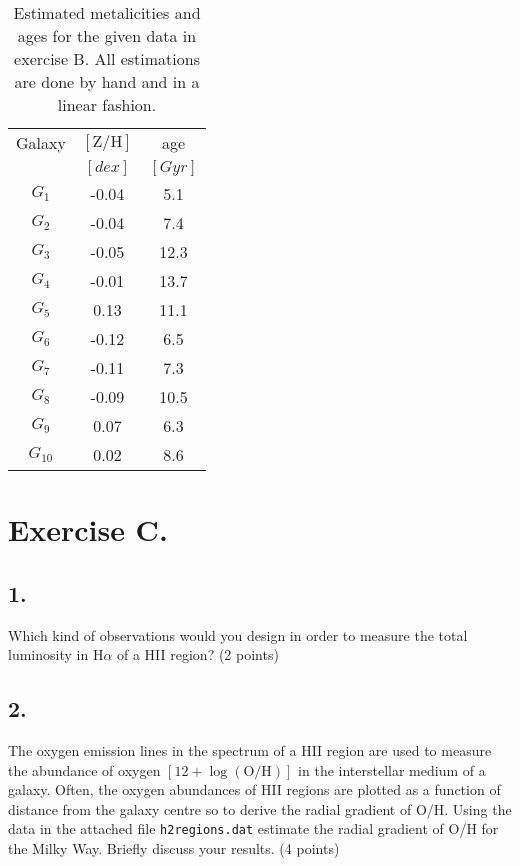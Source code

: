 \documentclass[11pt,a4paper,twoside]{article}
\newcommand{\ZH}{\ensuremath{[\text{Z}/\text{H}]} }
\begin{document}
\begin{table}[h!]
\centering
\begin{tabular}{ccc}\toprule
Galaxy  & \ZH           & age               \\
        & $[\si{dex}]$  & $[\si{Gyr}]$      \\ \midrule
$G_1$   & -0.04         & 5.1				\\
$G_2$   & -0.04	        & 7.4				\\
$G_3$   & -0.05	        & 12.3				\\
$G_4$   & -0.01	        & 13.7				\\
$G_5$   & 0.13	        & 11.1				\\
$G_6$   & -0.12	        & 6.5				\\
$G_7$   & -0.11	        & 7.3				\\
$G_8$   & -0.09	        & 10.5				\\
$G_9$   & 0.07	        & 6.3				\\
$G_{10}$& 0.02	        & 8.6				\\
\bottomrule
\end{tabular}
\caption{Estimated metalicities and ages for the given data in
exercise B. All estimations are done by hand and in a linear 
fashion.}
\label{tab:am}
\end{table}


\section*{Exercise C.}

\subsection*{1.} Which kind of observations would you design in order to measure the total luminosity in $\text{H}\alpha$ of a HII region? (2 points) \\


\subsection*{2.} The oxygen emission lines in the spectrum of a HII region are used to measure the abundance of oxygen $ \left[12 + \log{\left( \text{O/H} \right)} \right]$ in the interstellar medium of a galaxy. Often, the oxygen abundances of HII regions are plotted as a function of distance from the galaxy centre so to derive the radial gradient of O/H. Using the data in the attached file \texttt{h2regions.dat} estimate the radial gradient of O/H for the Milky Way. Briefly discuss your results. (4 points) \\
\end{document}
